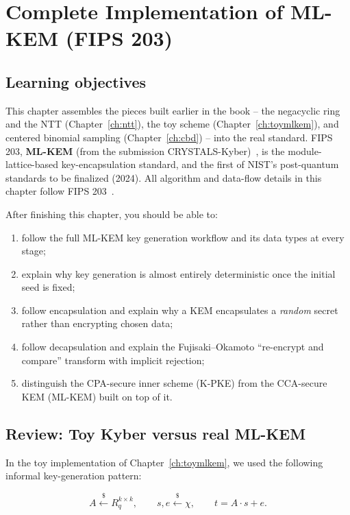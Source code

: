 \chapter{Complete Implementation of ML-KEM (FIPS 203)}
\label{ch:fips203}

\section{Learning objectives}

This chapter assembles the pieces built earlier in the book -- the negacyclic ring and the NTT (Chapter~\ref{ch:ntt}), the toy scheme (Chapter~\ref{ch:toymlkem}), and centered binomial sampling (Chapter~\ref{ch:cbd}) -- into the real standard. FIPS 203, \textbf{ML-KEM} (from the submission CRYSTALS-Kyber)~\cite{fips203,kyber2018}, is the module-lattice-based key-encapsulation standard, and the first of NIST's post-quantum standards to be finalized (2024). All algorithm and data-flow details in this chapter follow FIPS 203~\cite{fips203}.

After finishing this chapter, you should be able to:

\begin{enumerate}
  \item follow the full ML-KEM key generation workflow and its data types at every stage;
  \item explain why key generation is almost entirely deterministic once the initial seed is fixed;
  \item follow encapsulation and explain why a KEM encapsulates a \emph{random} secret rather than encrypting chosen data;
  \item follow decapsulation and explain the Fujisaki--Okamoto ``re-encrypt and compare'' transform with implicit rejection;
  \item distinguish the CPA-secure inner scheme (K-PKE) from the CCA-secure KEM (ML-KEM) built on top of it.
\end{enumerate}

\section{Review: Toy Kyber versus real ML-KEM}

In the toy implementation of Chapter~\ref{ch:toymlkem}, we used the following informal key-generation pattern:

\[
A \xleftarrow{\$} R_q^{k\times k}, \qquad s,e \xleftarrow{\$} \chi, \qquad t = A\cdot s + e.
\]


